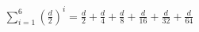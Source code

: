 \documentclass[preview]{standalone}
\begin{document}
\begin{align*}
\sum_{i=1}^{6} \left(\frac{d}{2}\right)^i =\frac{d}{2} + \frac{d}{4} + \frac{d}{8} + \frac{d}{16} + \frac{d}{32} + \frac{d}{64}
\end{align*}
\end{document}

